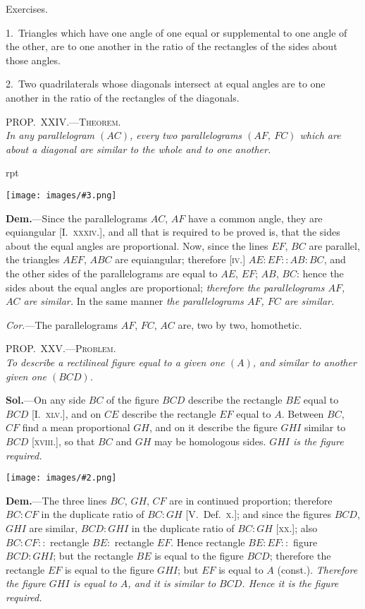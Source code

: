 \documentclass[oneside]{book}
\newcounter{wrapwidth}
\newcommand\myprop[2]{
\bigskip\Needspace*{4\baselineskip}\begin{center}\textsc{#1}\\\medskip\emph{#2}\par\end{center}
}
\newcommand\exhead[1]{
\Needspace*{5\baselineskip}\begin{center}
\textsf{#1}
\end{center}
}
\newcommand\imgflow[3]{
\setcounter{wrapwidth}{#1}
\begin{wrapfigure}[#2]{r}{\value{wrapwidth}pt}
\begin{center}
\vspace{-0.3in}
\texttt{[image: images/\#3.png]}
\end{center}
\end{wrapfigure}
}
\newcommand\imgcent[2]{
\begin{center}
\texttt{[image: images/\#2.png]}
\end{center}
}
\begin{document}
\exhead{Exercises.}

\begin{footnotesize}
1.~Triangles which have one angle of one equal or supplemental
to one angle of the other, are to one another in the ratio
of the rectangles of the sides about those angles.

2.~Two quadrilaterals whose diagonals intersect at equal
angles are to one another in the ratio of the rectangles of the
diagonals.

\par\end{footnotesize}


\myprop{PROP\@.~XXIV\@.---Theorem.}{In any parallelogram $(AC)$, every two parallelograms
$(AF,\ FC)$ which are about a diagonal are similar to the
whole and to one another.}

\imgflow{80}{8}{f204}

\textbf{Dem.}---Since the parallelograms $AC$, $AF$ have a
common angle, they are equiangular
[I.~\textsc{xxxiv.}], and all that is required to
be proved is, that the sides about the
equal angles are proportional. Now,
since the lines $EF$, $BC$ are parallel, the
triangles $AEF$, $ABC$ are equiangular;
therefore [\textsc{iv.}] $AE : EF :: AB : BC$,
and the other sides of the parallelograms
are equal to $AE$, $EF$; $AB$, $BC$: hence the sides
about the equal angles are proportional; \emph{therefore the
parallelograms $AF$, $AC$ are similar.} In the same manner
\emph{the parallelograms $AF$, $FC$ are similar.}

\emph{Cor.}---The parallelograms $AF$, $FC$, $AC$ are, two by
two, homothetic.

\myprop{PROP\@.~XXV\@.---Problem.}{To describe a rectilineal figure equal to a given one $(A)$,
and similar to another given one $(BCD)$.}

\textbf{Sol.}---On any side $BC$ of the figure $BCD$ describe the
rectangle $BE$ equal to $BCD$ [I.~\textsc{xlv.}], and on $CE$ describe
the rectangle $EF$ equal to $A$. Between $BC$, $CF$
find a mean proportional $GH$, and on it describe the
figure $GHI$ similar to $BCD$ [\textsc{xviii.}], so that $BC$ and
$GH$ may be homologous sides. \emph{$GHI$ is the figure required.}

\imgcent{240}{f205}

\textbf{Dem.}---The three lines $BC$, $GH$, $CF$ are in continued
proportion; therefore $BC : CF$ in the duplicate ratio
of $BC : GH$ [V.\ Def.~\textsc{x.}]; and since the figures $BCD$,
$GHI$ are similar, $BCD : GHI$ in the duplicate ratio
of $BC : GH$ [\textsc{xx.}]; also $BC : CF ::$ rectangle $BE :$
rectangle $EF$. Hence rectangle $BE : EF ::$ figure
$BCD : GHI$; but the rectangle $BE$ is equal to the
figure $BCD$; therefore the rectangle $EF$ is equal to
the figure $GHI$; but $EF$ is equal to $A$ (const.). \emph{Therefore
the figure $GHI$ is equal to $A$, and it is similar to
$BCD$. Hence it is the figure required.}
\end{document}
